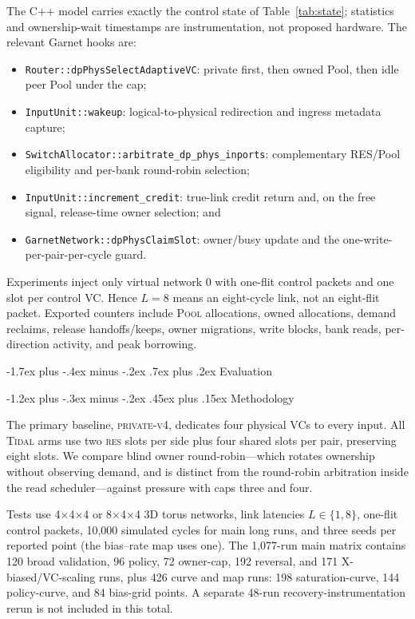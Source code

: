 \documentclass[10pt,twocolumn]{article}
\makeatletter
\newcommand{\system}{\textsc{Tidal}\xspace}
\newcommand{\res}{\textsc{res}\xspace}
\newcommand{\pool}{\textsc{Pool}\xspace}
\newcommand{\privatefour}{\textsc{private-v4}\xspace}
\renewcommand\section{\@startsection{section}{1}{\z@}%
  {-1.7ex plus -.4ex minus -.2ex}%
  {.7ex plus .2ex}%
  {\normalfont\large\bfseries}}
\renewcommand\subsection{\@startsection{subsection}{2}{\z@}%
  {-1.2ex plus -.3ex minus -.2ex}%
  {.45ex plus .15ex}%
  {\normalfont\normalsize\bfseries}}
\makeatother
\begin{document}
The C++ model carries exactly the control state of
Table~\ref{tab:state}; statistics and ownership-wait timestamps are
instrumentation, not proposed hardware. The relevant Garnet hooks are:
\begin{itemize}
  \setlength{\itemsep}{0pt}
  \setlength{\topsep}{2pt}
  \item \texttt{Router::dpPhysSelectAdaptiveVC}: private first, then owned
  Pool, then idle peer Pool under the cap;
  \item \texttt{InputUnit::wakeup}: logical-to-physical redirection and
  ingress metadata capture;
  \item \texttt{SwitchAllocator::arbitrate\_dp\_phys\_inports}: complementary
  RES/Pool eligibility and per-bank round-robin selection;
  \item \texttt{InputUnit::increment\_credit}: true-link credit return and,
  on the free signal, release-time owner selection; and
  \item \texttt{GarnetNetwork::dpPhysClaimSlot}: owner/busy update and the
  one-write-per-pair-per-cycle guard.
\end{itemize}

Experiments inject only virtual network 0 with one-flit control packets and
one slot per control VC. Hence $L=8$ means an eight-cycle link, not an
eight-flit packet. Exported counters include \pool allocations, owned
allocations, demand reclaims, release handoffs/keeps, owner migrations,
write blocks, bank reads, per-direction activity, and peak borrowing.

\section{Evaluation}

\subsection{Methodology}

The primary baseline, \privatefour, dedicates four physical VCs to every input.
All \system arms use two \res slots per side plus four shared slots per pair,
preserving eight slots. We compare blind owner round-robin---which rotates
ownership without observing demand, and is distinct from the round-robin
arbitration inside the read scheduler---against pressure with caps three and
four.

Tests use 4$\times$4$\times$4 or 8$\times$4$\times$4 3D torus networks, link
latencies $L\in\{1,8\}$, one-flit control packets, 10,000 simulated cycles for
main long runs, and three seeds per reported point (the bias--rate map uses
one). The 1,077-run main matrix contains 120 broad validation, 96 policy,
72 owner-cap, 192 reversal, and 171 X-biased/VC-scaling runs, plus 426
curve and map runs: 198 saturation-curve, 144 policy-curve, and 84
bias-grid points. A separate 48-run recovery-instrumentation rerun is not
included in this total.
\end{document}
